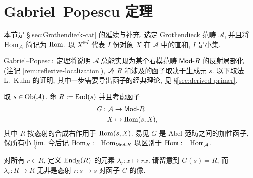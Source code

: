 \section{Gabriel--Popescu 定理}\label{sec:GP}
本节是 \S\ref{sec:Grothendieck-cat} 的延续与补充. 选定 Grothendieck 范畴 $\mathcal{A}$, 并且将 $\operatorname{Hom}_{\mathcal{A}}$ 简记为 $\operatorname{Hom}$. 以 $X^{\oplus I}$ 代表 $I$ 份对象 $X$ 在 $\mathcal{A}$ 中的直和, $I$ 是小集.

Gabriel--Popescu 定理将说明 $\mathcal{A}$ 总能实现为某个右模范畴 $\mathsf{Mod}\text{-}R$ 的反射局部化 (注记 \ref{rem:reflexive-localization}), 环 $R$ 和涉及的函子取决于生成元 $s$. 以下取法 L.\ Kuhn \cite{Ku94} 的证明, 其中一步需要导出函子的经典理论, 见 \S\ref{sec:derived-primer}.

取 $s \in \operatorname{Ob}(\mathcal{A})$. 命 $R := \operatorname{End}(s)$ 并且考虑函子
\begin{align*}
	G: \mathcal{A} & \to \mathsf{Mod}\text{-}R \\
	X & \mapsto \operatorname{Hom}(s, X),
\end{align*}
其中 $R$ 按态射的合成右作用于 $\operatorname{Hom}(s, X)$. 易见 $G$ 是 Abel 范畴之间的加性函子, 保所有小 $\varprojlim$. 今后记 $\operatorname{Hom}_R := \operatorname{Hom}_{\mathsf{Mod}\text{-}R}$ 以区别于 $\operatorname{Hom} := \operatorname{Hom}_{\mathcal{A}}$.

对所有 $r \in R$, 定义 $\operatorname{End}_R(R)$ 的元素 $\lambda_r: x \mapsto rx$. 请留意到 $G(s) = R$, 而 $\lambda_r: R \to R$ 无非是态射 $r: s \to s$ 对函子 $G$ 的像.

